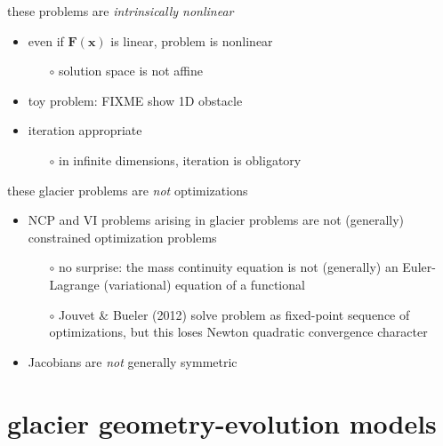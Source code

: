 \documentclass{beamer}
\newcommand\bx{\mathbf{x}}
\newcommand\bF{\mathbf{F}}
\begin{document}
\begin{frame}{these problems are \emph{intrinsically nonlinear}}

\begin{itemize}
\item even if $\bF(\bx)$ is linear, problem is nonlinear
  \begin{itemize}
  \item[$\circ$]  solution space is not affine
  \end{itemize}
\item toy problem:  FIXME show 1D obstacle
\item iteration appropriate
  \begin{itemize}
  \item[$\circ$]  in infinite dimensions, iteration is obligatory
  \end{itemize}
\end{itemize}
\end{frame}


\begin{frame}{these glacier problems are \emph{not} optimizations}

\begin{itemize}
\item NCP and VI problems arising in glacier problems are not (generally) constrained optimization problems
  \begin{itemize}
  \item[$\circ$]  no surprise: the mass continuity equation is not (generally) an Euler-Lagrange (variational) equation of a functional
  \item[$\circ$]  Jouvet \& Bueler (2012) solve problem as fixed-point sequence of optimizations, but this loses Newton quadratic convergence character
  \end{itemize}
\item Jacobians are \emph{not} generally symmetric
\end{itemize}
\end{frame}



\section{glacier geometry-evolution models}
\end{document}
